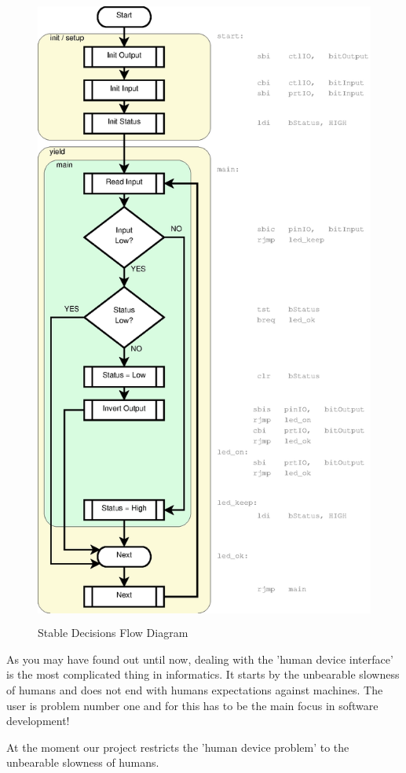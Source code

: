 \begin{figure}[htbp]
  \centering
  \includegraphics[height=210mm]{LED/S005_stable-decisions+symbols.eps}
  \caption{Stable Decisions Flow Diagram}
  \label{S005FlowDiagam}
\end{figure}

As you may have found out until now, dealing with the 'human device interface' is the most complicated thing in informatics. It starts by the unbearable slowness of humans and does not end with humans expectations against machines. The user is problem number one and for this has to be the main focus in software development!

At the moment our project restricts the 'human device problem' to the unbearable slowness of humans.

